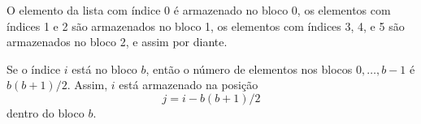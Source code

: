 \documentclass{beamer}
\begin{document}
\begin{frame}


O elemento da lista com índice 0 é armazenado no bloco 0,
os elementos com índices 1 e 2 são armazenados no bloco 1, os elementos com índices 3, 4, e 5 são armazenados no bloco 2, e assim por diante.  

Se o índice \ensuremath{\ensuremath{\ensuremath{\mathit{i}}}} está no bloco \ensuremath{\ensuremath{\ensuremath{\mathit{b}}}}, então o número de elementos nos blocos
$0,\ldots,\ensuremath{\ensuremath{\ensuremath{\mathit{b}}}}-1$ é $\ensuremath{\ensuremath{\ensuremath{\mathit{b}}}}(\ensuremath{\ensuremath{\ensuremath{\mathit{b}}}}+1)/2$.  Assim, \ensuremath{\ensuremath{\ensuremath{\mathit{i}}}} está armazenado na posição
\[
     \ensuremath{\ensuremath{\ensuremath{\mathit{j}}}} = \ensuremath{\ensuremath{\ensuremath{\mathit{i}}}} - \ensuremath{\ensuremath{\ensuremath{\mathit{b}}}}(\ensuremath{\ensuremath{\ensuremath{\mathit{b}}}}+1)/2
\]
dentro do bloco \ensuremath{\ensuremath{\ensuremath{\mathit{b}}}}. 

\end{frame}
\end{document}
